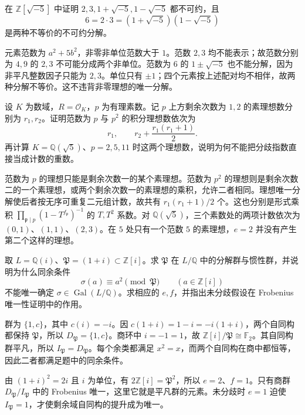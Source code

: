 \begin{exercise}\label{b3:ex:A-two-factorizations}
	在 \(\mathbb Z[\sqrt{-5}]\) 中证明 \(2,3,1+\sqrt{-5},1-\sqrt{-5}\) 都不可约，且
	\[
		6=2\cdot3=(1+\sqrt{-5})(1-\sqrt{-5})
	\]
	是两种不等价的不可约分解。
\end{exercise}
\begin{solution}
	元素范数为 \(a^2+5b^2\)，非零非单位范数大于 \(1\)。范数 \(2,3\) 均不能表示；故范数分别为 \(4,9\) 的 \(2,3\) 不可能分成两个非单位。范数为 \(6\) 的 \(1\pm\sqrt{-5}\) 也不能分解，因为非平凡整数因子只能为 \(2,3\)。单位只有 \(\pm1\)；四个元素按上述配对均不相伴，故两种分解不等价。这不违背非零理想的唯一分解。
\end{solution}

\begin{exercise}\label{b3:ex:A-euler-factors}
	设 \(K\) 为数域，\(R=\mathcal O_K\)，\(p\) 为有理素数。记 \(p\) 上方剩余次数为 \(1,2\) 的素理想数分别为 \(r_1,r_2\)。证明范数为 \(p\) 与 \(p^2\) 的积分理想数依次为
	\[
		r_1,\qquad r_2+\dfrac{r_1(r_1+1)}2.
	\]
	再计算 \(K=\mathbb Q(\sqrt5)\)、\(p=2,5,11\) 时这两个理想数，说明为何不能把分歧指数直接当成计数的重数。
\end{exercise}
\begin{solution}
	范数为 \(p\) 的理想只能是剩余次数一的某个素理想。范数为 \(p^2\) 的理想则是剩余次数二的一个素理想，或两个剩余次数一的素理想的乘积，允许二者相同。理想唯一分解使后者按无序可重复二元组计数，故共有 \(r_1(r_1+1)/2\) 个。这也分别是形式乘积 \(\prod_{\mathfrak p\mid p}(1-T^{f_{\mathfrak p}})^{-1}\) 的 \(T,T^2\) 系数。对 \(\mathbb Q(\sqrt5)\)，三个素数处的两项计数依次为 \((0,1)\)、\((1,1)\)、\((2,3)\)。在 \(5\) 处只有一个范数 \(5\) 的素理想，\(e=2\) 并没有产生第二个这样的理想。
\end{solution}


\begin{exercise}\label{b3:ex:A-frobenius-ramified-choice}
	取 \(L=\mathbb Q(i)\)、\(\mathfrak P=(1+i)\subset\mathbb Z[i]\)。求 \(\mathfrak P\) 在 \(L/\mathbb Q\) 中的分解群与惯性群，并说明为什么同余条件
	\[
		\sigma(a)\equiv a^2\pmod{\mathfrak P}\qquad(a\in\mathbb Z[i])
	\]
	不能唯一确定 \(\sigma\in\operatorname{Gal}(L/\mathbb Q)\)。求相应的 \(e,f\)，并指出未分歧假设在 Frobenius 唯一性证明中的作用。
\end{exercise}
\begin{solution}
	群为 \(\{1,c\}\)，其中 \(c(i)=-i\)。因 \(c(1+i)=1-i=-i(1+i)\)，两个自同构都保持 \(\mathfrak P\)，所以 \(D_{\mathfrak P}=\{1,c\}\)。商环中 \(i=-1=1\)，故 \(\mathbb Z[i]/\mathfrak P\cong\mathbb F_2\)。其自同构群平凡，所以 \(I_{\mathfrak P}=D_{\mathfrak P}\)。每个余类都满足 \(x^2=x\)，而两个自同构在商中都恒等，因此二者都满足题中的同余条件。

	由 \((1+i)^2=2i\) 且 \(i\) 为单位，有 \(2\mathbb Z[i]=\mathfrak P^2\)，所以 \(e=2\)、\(f=1\)。只有商群 \(D_{\mathfrak P}/I_{\mathfrak P}\) 中的 Frobenius 唯一，这里它就是平凡群的元素。未分歧时 \(e=1\) 迫使 \(I_{\mathfrak P}=1\)，才使剩余域自同构的提升成为唯一。
\end{solution}

